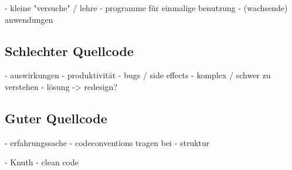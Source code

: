  - kleine "versuche" / lehre
 - programme für einmalige benutzung
 - (wachsende) anwendungen 

\subsection{Schlechter Quellcode}

 - auswirkungen
   - produktivität
 - bugs / side effects
 - komplex / schwer zu verstehen
 - lösung -> redesign?

\subsection{Guter Quellcode}

 - erfahrungssache
 - codeconventions tragen bei
 - struktur

 - Knuth
 - clean code

